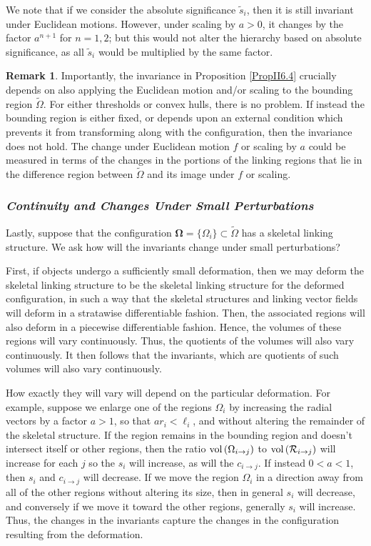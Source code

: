 \documentclass[10pt]{amsart}
\theoremstyle{definition}
\theoremstyle{definition}
\newtheorem{Remark}[Thm]{Remark}
\numberwithin{equation}{section}
\newcommand{\vol}{{\rm vol}\,}
\def \bgW {\boldsymbol \Omega}
\def \cR {\mathcal{R}}
\def \gW {\Omega}
\begin{document}
\par 
We note that if we consider the absolute significance $\tilde s_i$, then it 
is still invariant under Euclidean motions. However, under scaling by $a > 
0$, it changes by the factor $a^{n+1}$ for $n=1,2$; but this would not alter 
the 
hierarchy based on absolute significance, as all $\tilde s_i$ would be 
multiplied by the same factor.
\begin{Remark}
\label{RemII.6.5}
\normalfont
Importantly, the invariance in Proposition \ref{PropII6.4} crucially 
depends on also applying the Euclidean motion and/or scaling to the 
bounding region $\tilde \gW$.  For either thresholds or convex hulls, there 
is no problem.  If instead the bounding region is either fixed, or depends 
upon an external condition which prevents it from transforming 
along with the configuration, then the invariance does not hold.  The 
change under Euclidean motion $f$ or scaling by $a$ could be measured in 
terms of the changes in the portions of the linking regions that lie in the 
difference region between $\tilde \gW$ and its image under $f$ or scaling.
\end{Remark}
\par  
\subsubsection*{\it Continuity and Changes Under Small Perturbations} 
\par
Lastly, suppose that the configuration $\bgW = \{\gW_i\} \subset \tilde 
\gW$ has a skeletal linking structure.  We ask how  will the invariants 
change under small perturbations?   \par
First, if objects undergo a sufficiently small deformation, then we may 
deform the skeletal linking structure to be the skeletal linking structure 
for the deformed configuration, in such a way that the skeletal structures 
and linking vector fields will deform in a stratawise differentiable 
fashion.  Then, the associated regions will also deform in a piecewise 
differentiable fashion.  Hence, the volumes of these regions will vary 
continuously.  Thus, the quotients of the volumes will also vary 
continuously.  It then follows that the invariants, which are quotients of 
such volumes will also vary continuously. 
\par
How exactly they will vary will depend on the particular deformation.  For 
example, suppose we enlarge one of the regions $\gW_i$ by increasing the 
radial vectors by a factor $a > 1$, so that $a r_i < \ell_i$, and without 
altering the remainder of the skeletal structure.  If the region remains in 
the bounding region and doesn\rq t intersect itself or other regions, then 
the ratio $\vol(\gW_{i \to j})$ to $\vol(\cR_{i \to j})$ will increase for 
each $j$ so the $s_i$ will increase, as will the $c_{i\to j}$.  If instead $0 
< a < 1$, then $s_i$ and $c_{i\to j}$ will decrease.  If we move the 
region $\gW_i$ in a direction away from all of the 
other regions without altering its size, then in general $s_i$ will 
decrease, and conversely if we move it toward the other regions, generally 
$s_i$ will increase. Thus, the changes in the invariants capture the 
changes in the configuration resulting from the deformation.
\end{document}
